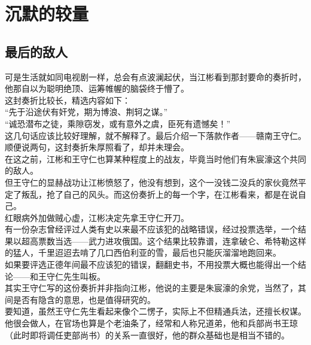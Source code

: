 \section{沉默的较量}
\ifnum{}
	\begin{multicols}{\theparacolNo}
\fi
\subsection{最后的敌人}
可是生活就如同电视剧一样，总会有点波澜起伏，当江彬看到那封要命的奏折时，他那自以为聪明绝顶、运筹帷幄的脑袋终于懵了。\\

这封奏折比较长，精选内容如下：\\

“先于沿途伏有奸党，期为博浪、荆轲之谋。”\\

“诚恐潜布之徒，乘隙窃发，或有意外之虞，臣死有遗憾矣！”\\

这几句话应该比较好理解，就不解释了。最后介绍一下落款作者——赣南王守仁。\\

顺便说两句，这封奏折朱厚照看了，却并未理会。\\

在这之前，江彬和王守仁也算某种程度上的战友，毕竟当时他们有朱宸濠这个共同的敌人。\\

但王守仁的显赫战功让江彬愤怒了，他没有想到，这个一没钱二没兵的家伙竟然平定了叛乱，抢了自己的风头。而这份奏折上的每一个字，在江彬看来，都是在说自己。\\

红眼病外加做贼心虚，江彬决定先拿王守仁开刀。\\

有一份杂志曾经评过人类有史以来最不应该犯的战略错误，经过投票选举，一个结果以超高票数当选——武力进攻俄国。这个结果比较靠谱，连拿破仑、希特勒这样的猛人，千里迢迢去啃了几口西伯利亚的雪，最后也只能灰溜溜地跑回来。\\

如果要评选正德年间最不应该犯的错误，翻翻史书，不用投票大概也能得出一个结论——和王守仁先生叫板。\\

其实王守仁写的这份奏折并非指向江彬，他说的主要是朱宸濠的余党，当然了，其间是否有隐含的意思，也是值得研究的。\\

要知道，虽然王守仁先生看起来像个二愣子，实际上不但精通兵法，还擅长权谋。他很会做人，在官场也算是个老油条了，经常和人称兄道弟，他和兵部尚书王琼（此时即将调任吏部尚书）的关系一直很好，他的群众基础也是相当不错的。\\


\end{multicols}
